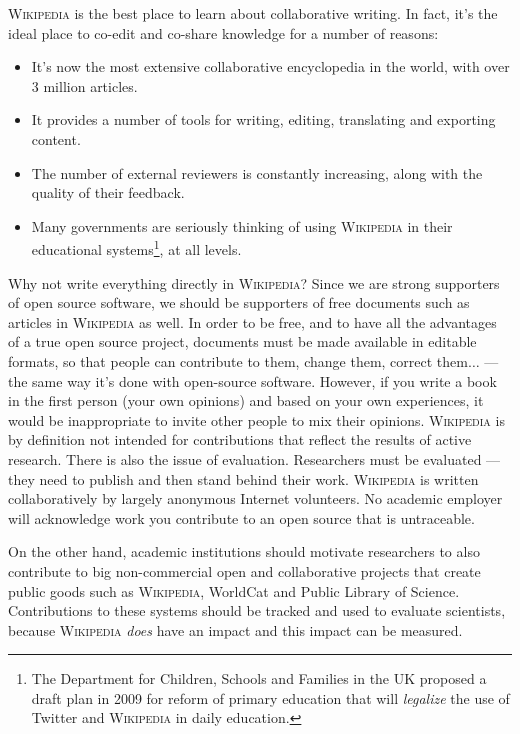 \documentclass[graybox,envcountchap,sectrefs,UStrade]{svmono}
\begin{document}
\textsc{Wikipedia} is the best place to learn about collaborative writing. In fact, it's the ideal place to co-edit and co-share knowledge for a number of reasons:

\begin{itemize}
  \item It's now the most extensive collaborative encyclopedia in the world, with over 3 million articles.
  \item It provides a number of tools for writing, editing, translating and exporting content.
  \item The number of external reviewers is constantly increasing, along with the quality of their feedback.
  \item Many governments are seriously thinking of using \textsc{Wikipedia} in their educational systems\footnote{The Department for Children, Schools and Families in the UK proposed a draft plan in 2009 for reform of primary education that will \emph{legalize} the use of Twitter and \textsc{Wikipedia} in daily education.}, at all levels.
\end{itemize}

Why not write everything directly in \textsc{Wikipedia}? Since we are strong supporters of open source software, we should be supporters of free documents such as articles in \textsc{Wikipedia} as well. In order to be free, and to have all the advantages of a true open source project, documents must be made available in editable formats, so that people can contribute to them, change them, correct them$\ldots$ --- the same way it's done with open-source software. However, if you write a book in the first person (your own opinions) and based on your own experiences, it would be inappropriate to invite other people to mix their opinions. \textsc{Wikipedia} is by definition not intended for contributions that reflect the results of active research. There is also the issue of evaluation. Researchers must be evaluated --- they need to publish and then stand behind their work. \textsc{Wikipedia} is written collaboratively by largely anonymous Internet volunteers. No academic employer will acknowledge work you contribute to an open source that is untraceable.\par

On the other hand, academic institutions should motivate researchers to also contribute to big non-commercial open and collaborative projects that create public goods such as \textsc{Wikipedia}, WorldCat and Public Library of Science. Contributions to these systems should be tracked and used to evaluate scientists, because \textsc{Wikipedia} \emph{does} have an impact and this impact can be measured.\par
\end{document}
